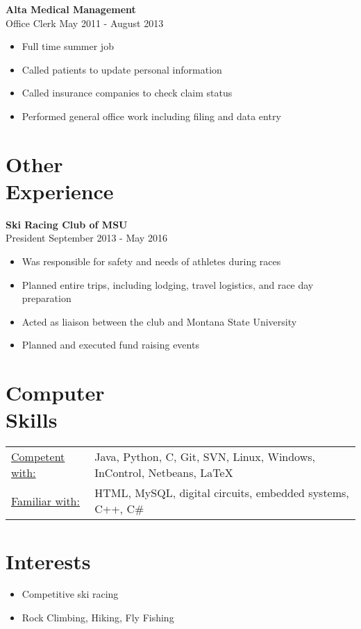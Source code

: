 \documentclass[margin]{res}
\begin{document}
\begin{resume}
\begin{itemize}
\end{itemize}

{\bf  Alta Medical Management}
\\Office Clerk           \hfill May 2011 - August 2013
\begin{itemize} \itemsep -2pt
\item Full time summer job
\item Called patients to update personal information
\item Called insurance companies to check claim status
\item Performed general office work including filing and data entry          
\end{itemize}

\noindent\makebox[\linewidth]{\rule{\paperwidth}{0.2pt}}
\section{Other \\ Experience}

{\bf  Ski Racing Club of MSU}  
\\President         \hfill  September 2013 - May 2016  
\begin{itemize} \itemsep -2pt
	\item Was responsible for safety and needs of athletes during races
	\item Planned entire trips, including lodging, travel logistics, and race day preparation
	\item Acted as liaison between the club and Montana State University 
	\item Planned and executed fund raising events
	          
\end{itemize}
  


\noindent\makebox[\linewidth]{\rule{\paperwidth}{0.2pt}}

\section{Computer \\ Skills}
   \begin{tabular}{l p{3in}}
    \underline{Competent with:} &  Java, Python, C, Git, SVN, Linux, Windows, InControl,  Netbeans, \LaTeX \\[1mm]
     \underline{Familiar with:} &  HTML, MySQL,  digital circuits, embedded systems, C++, C\#
 \end{tabular}
 
\noindent\makebox[\linewidth]{\rule{\paperwidth}{0.2pt}}
\section{Interests} 
\begin{itemize} \itemsep -2pt  %

\item Competitive ski racing
\item Rock Climbing, Hiking, Fly Fishing

\end{itemize}
\end{resume} 
\end{document}
